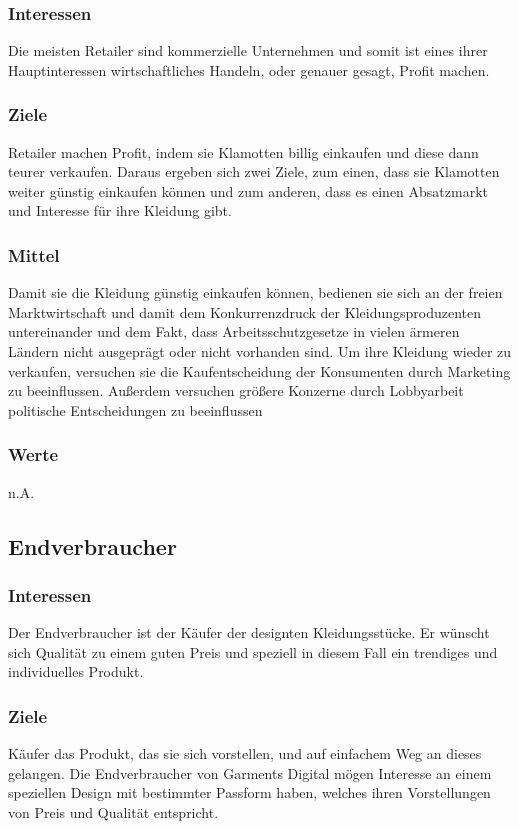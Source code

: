 \documentclass{article}
\begin{document}
\subsubsection{Interessen}
Die meisten Retailer sind kommerzielle Unternehmen und somit ist eines ihrer Hauptinteressen wirtschaftliches Handeln, oder genauer gesagt, Profit machen.
\subsubsection{Ziele}
Retailer machen Profit, indem sie Klamotten billig einkaufen und diese dann teurer verkaufen. Daraus ergeben sich zwei Ziele, zum einen, dass sie Klamotten weiter günstig einkaufen können und zum anderen, dass es einen Absatzmarkt und Interesse für ihre Kleidung gibt.
\subsubsection{Mittel}
Damit sie die Kleidung günstig einkaufen können, bedienen sie sich an der freien Marktwirtschaft und damit dem Konkurrenzdruck der Kleidungsproduzenten untereinander und dem Fakt, dass Arbeitsschutzgesetze in vielen ärmeren Ländern nicht ausgeprägt oder nicht vorhanden sind. Um ihre Kleidung wieder zu verkaufen, versuchen sie die Kaufentscheidung der Konsumenten durch Marketing zu beeinflussen. Außerdem versuchen größere Konzerne durch Lobbyarbeit politische Entscheidungen zu beeinflussen \cite{LobbyFactsHM}
\subsubsection{Werte}
n.A.

\subsection{Endverbraucher}
\subsubsection{Interessen}
Der Endverbraucher ist der Käufer der designten Kleidungsstücke. Er wünscht sich Qualität zu einem guten Preis und speziell in diesem Fall ein trendiges und individuelles Produkt.
\subsubsection{Ziele}
Käufer das Produkt, das sie sich vorstellen, und auf einfachem Weg an dieses gelangen. Die Endverbraucher von Garments Digital mögen Interesse an einem speziellen Design mit bestimmter Passform haben, welches ihren Vorstellungen von Preis und Qualität entspricht.
\end{document}
